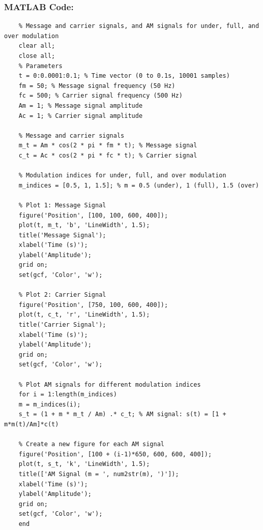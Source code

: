 \documentclass[a4paper,12pt]{article}
\begin{document}
\subsubsection{MATLAB Code:}
\begin{lstlisting}[style=vscode-light, caption={Solving Non-linear Equation Using Newton-Raphson Method in MATLAB.} ]
	% MATLAB code for AM modulation with separate plots
	% Message and carrier signals, and AM signals for under, full, and over modulation
	clear all;
	close all;
	% Parameters
	t = 0:0.0001:0.1; % Time vector (0 to 0.1s, 10001 samples)
	fm = 50; % Message signal frequency (50 Hz)
	fc = 500; % Carrier signal frequency (500 Hz)
	Am = 1; % Message signal amplitude
	Ac = 1; % Carrier signal amplitude
	
	% Message and carrier signals
	m_t = Am * cos(2 * pi * fm * t); % Message signal
	c_t = Ac * cos(2 * pi * fc * t); % Carrier signal
	
	% Modulation indices for under, full, and over modulation
	m_indices = [0.5, 1, 1.5]; % m = 0.5 (under), 1 (full), 1.5 (over)
	
	% Plot 1: Message Signal
	figure('Position', [100, 100, 600, 400]);
	plot(t, m_t, 'b', 'LineWidth', 1.5);
	title('Message Signal');
	xlabel('Time (s)');
	ylabel('Amplitude');
	grid on;
	set(gcf, 'Color', 'w');
	
	% Plot 2: Carrier Signal
	figure('Position', [750, 100, 600, 400]);
	plot(t, c_t, 'r', 'LineWidth', 1.5);
	title('Carrier Signal');
	xlabel('Time (s)');
	ylabel('Amplitude');
	grid on;
	set(gcf, 'Color', 'w');
	
	% Plot AM signals for different modulation indices
	for i = 1:length(m_indices)
	m = m_indices(i);
	s_t = (1 + m * m_t / Am) .* c_t; % AM signal: s(t) = [1 + m*m(t)/Am]*c(t)
	
	% Create a new figure for each AM signal
	figure('Position', [100 + (i-1)*650, 600, 600, 400]);
	plot(t, s_t, 'k', 'LineWidth', 1.5);
	title(['AM Signal (m = ', num2str(m), ')']);
	xlabel('Time (s)');
	ylabel('Amplitude');
	grid on;
	set(gcf, 'Color', 'w');
	end
	
	
	
\end{lstlisting}
\end{document}
